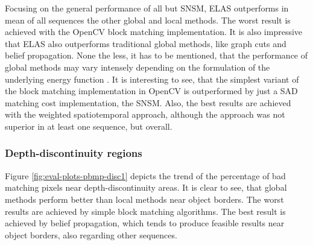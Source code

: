 \noindent Focusing on the general performance of all but SNSM, ELAS outperforms in mean of all sequences the other global and local methods.
The worst result is achieved with the OpenCV block matching implementation.
It is also impressive that ELAS also outperforms traditional global methods, like graph cuts and belief propagation.
None the less, it has to be mentioned, that the performance of global methods may vary intensely depending on the formulation of the underlying energy function \citep{cyganek2011introduction, szeliski2008comparative, scharstein2006middlebury}.
It is interesting to see, that the simplest variant of the block matching implementation in OpenCV is outperformed by just a SAD matching cost implementation, the SNSM.
Also, the best results are achieved with the weighted spatiotemporal approach, although the approach was not superior in at least one sequence, but overall.

\begin{table}[h!]
\centering
{}
\caption[Result table for general performance]{Result table for general performance, focusing on PBMP$_{noc,1px}$}
\label{fig:eval:general:performance2}
\end{table}

\subsubsection{Depth-discontinuity regions}

Figure \ref{fig:eval-plots-pbmp-disc1} depicts the trend of the percentage of bad matching pixels near depth-discontinuity areas.
It is clear to see, that global methods perform better than local methods near object borders.
The worst results are achieved by simple block matching algorithms.
The best result is achieved by belief propagation, which tends to produce feasible results near object borders, also regarding other sequences.


